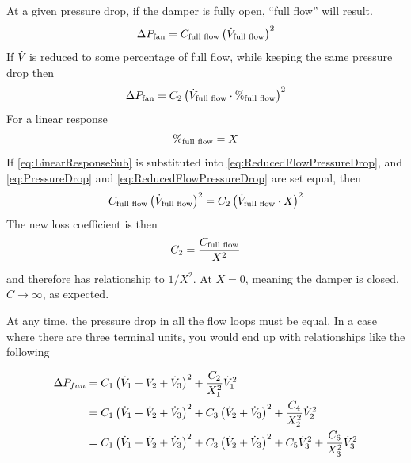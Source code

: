 At a given pressure drop, if the damper is fully open, ``full flow''
will result. 
\begin{equation}\label{eq:PressureDrop}
    \Delta P_{\text{fan}} = C_{\text{full flow}}\left(\dot{V}_{\text{full flow}}\right)^2
\end{equation}
%
If \(\dot{V}_{}\) is reduced to some percentage of full flow, while keeping
the same pressure drop then
\begin{equation}\label{eq:ReducedFlowPressureDrop}
    \Delta P_{\text{fan}} = C_{2}\left(\dot{V}_{\text{full flow}} \cdot \%_{\text{full flow}} \right)^2
\end{equation}
%
For a linear response
%
\begin{equation}\label{eq:LinearResponseSub}
    \%_{\text{full flow}} = X_{}
\end{equation}
If  \ref{eq:LinearResponseSub} is substituted into
 \ref{eq:ReducedFlowPressureDrop}, and 
\ref{eq:PressureDrop} and \ref{eq:ReducedFlowPressureDrop} are set
equal, then
\begin{equation}
    C_{\text{full flow}}\left(\dot{V}_{\text{full flow}}\right)^2 = C_{2}\left(\dot{V}_{\text{full flow}} \cdot X_{} \right)^2
\end{equation}
The new loss coefficient is then 
\begin{equation}
    C_{2} = \frac{C_{\text{full flow}}}{X_{}^{2}}
\end{equation}
and therefore has relationship to \(1/X^2\). At \(X=0\), meaning the
damper is closed, \(C\to \infty\), as expected. 

At any time, the pressure drop in all the flow loops must be equal. In a
case where there are three terminal units, you would end up with
relationships like the following

\begin{align}\label{eq:FanLoopPressureDrop}
    \Delta P_{fan}  &= C_1 \left(\dot{V}_{1}+\dot{V}_{2}+\dot{V}_{3} \right)^2 + \frac{C_2}{X_{1}^2}\dot{V}_{1}^2 \\ 
                    &= C_1 \left(\dot{V}_{1}+\dot{V}_{2}+\dot{V}_{3} \right)^2 + C_3\left(\dot{V}_{2}+\dot{V}_{3} \right)^2 + \frac{C_4}{X_{2}^2}\dot{V}_{2}^2 \\
                    &= C_1 \left(\dot{V}_{1}+\dot{V}_{2}+\dot{V}_{3} \right)^2 + C_3\left(\dot{V}_{2}+\dot{V}_{3} \right)^2 + C_5\dot{V}_{3}^2 + \frac{C_6}{X_{3}^2}\dot{V}_{3}^2
\end{align}


